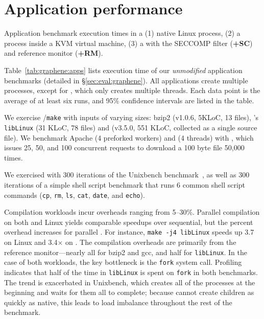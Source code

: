\section{Application performance}
\label{sec:eval:apps}


\begin{table}[t!b!]

\caption{Application benchmark execution times in a (1) native Linux process, (2) a process inside a KVM virtual machine, (3) a \graphene{} \picoproc{} with the SECCOMP filter ({\bf +SC}) and reference monitor ({\bf +RM}). }
\label{tab:graphene:apps}
\end{table}



Table~\ref{tab:graphene:apps} lists 
execution time of our {\em unmodified} 
application benchmarks (detailed in \S\ref{sec:eval:graphene}).
All applications create multiple processes,
except for \lighttpd{}, which only creates multiple threads.
Each data point is the average of at least six runs, 
and 95\% confidence intervals are listed in the table.

We exercise  {\tt \gcc{}}/{\tt make}
with inputs of varying sizes:
bzip2 (v1.0.6, 5KLoC, 13 files),
\graphene{}'s {\tt libLinux} (31 KLoC, 78 files)
and \gcc{} (v3.5.0, 551 KLoC, collected as a single source file). 
We benchmark Apache (4 preforked workers) and \lighttpd{} (4 threads) with 
\ab{},
which issues 25, 50, and 100 concurrent requests
to download a 100 byte file 50,000 times.

We exercised \busy{} with 
300 iterations of the Unixbench benchmark~\cite{unixbench}, as well as 
300 iterations of a simple shell script benchmark that runs 6 common shell script commands
({\tt cp}, {\tt rm}, {\tt ls}, {\tt cat}, {\tt date}, and {\tt echo}).

Compilation workloads incur overheads ranging from 5--30\%.
Parallel compilation on both \graphene{} and Linux yields comparable  speedups  over sequential,
but the percent overhead increases for parallel \graphene{}.
For instance, {\tt make -j4 libLinux} speeds up 3.7\x{} on Linux and 3.4$\times$ on \graphene{}.
The compilation overheads are primarily from the reference monitor---nearly all for bzip2 and gcc, and half for {\tt libLinux}.
In the case of both \busy{} workloads, the key bottleneck is the {\tt fork} system call.
Profiling indicates that half of the time in {\tt libLinux} is spent on {\tt fork} in both benchmarks.
The trend is exacerbated in Unixbench, which creates all of the processes at the beginning and
waits for them all to complete; because \graphene{} cannot create children as quickly as native, this leads to 
load imbalance throughout the rest of the benchmark.  

